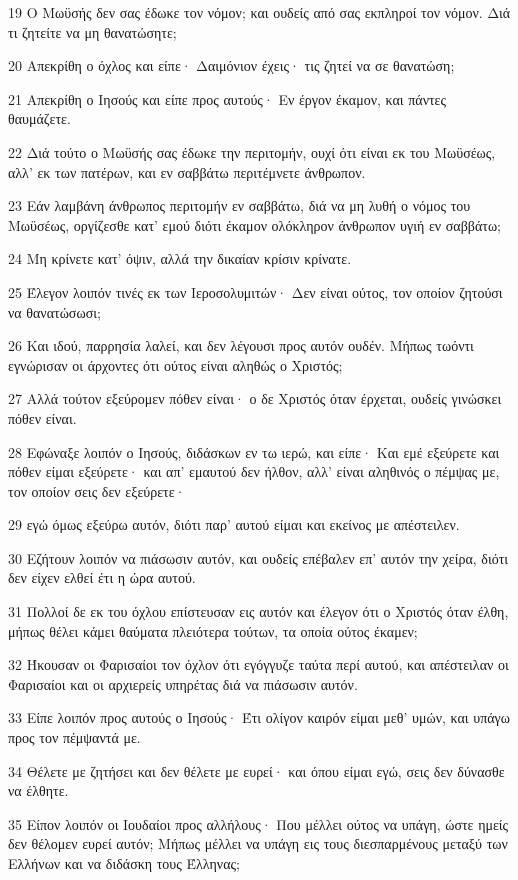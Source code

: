\par 19 Ο Μωϋσής δεν σας έδωκε τον νόμον; και ουδείς από σας εκπληροί τον νόμον. Διά τι ζητείτε να μη θανατώσητε;
\par 20 Απεκρίθη ο όχλος και είπε· Δαιμόνιον έχεις· τις ζητεί να σε θανατώση;
\par 21 Απεκρίθη ο Ιησούς και είπε προς αυτούς· Εν έργον έκαμον, και πάντες θαυμάζετε.
\par 22 Διά τούτο ο Μωϋσής σας έδωκε την περιτομήν, ουχί ότι είναι εκ του Μωϋσέως, αλλ' εκ των πατέρων, και εν σαββάτω περιτέμνετε άνθρωπον.
\par 23 Εάν λαμβάνη άνθρωπος περιτομήν εν σαββάτω, διά να μη λυθή ο νόμος του Μωϋσέως, οργίζεσθε κατ' εμού διότι έκαμον ολόκληρον άνθρωπον υγιή εν σαββάτω;
\par 24 Μη κρίνετε κατ' όψιν, αλλά την δικαίαν κρίσιν κρίνατε.
\par 25 Έλεγον λοιπόν τινές εκ των Ιεροσολυμιτών· Δεν είναι ούτος, τον οποίον ζητούσι να θανατώσωσι;
\par 26 Και ιδού, παρρησία λαλεί, και δεν λέγουσι προς αυτόν ουδέν. Μήπως τωόντι εγνώρισαν οι άρχοντες ότι ούτος είναι αληθώς ο Χριστός;
\par 27 Αλλά τούτον εξεύρομεν πόθεν είναι· ο δε Χριστός όταν έρχεται, ουδείς γινώσκει πόθεν είναι.
\par 28 Εφώναξε λοιπόν ο Ιησούς, διδάσκων εν τω ιερώ, και είπε· Και εμέ εξεύρετε και πόθεν είμαι εξεύρετε· και απ' εμαυτού δεν ήλθον, αλλ' είναι αληθινός ο πέμψας με, τον οποίον σεις δεν εξεύρετε·
\par 29 εγώ όμως εξεύρω αυτόν, διότι παρ' αυτού είμαι και εκείνος με απέστειλεν.
\par 30 Εζήτουν λοιπόν να πιάσωσιν αυτόν, και ουδείς επέβαλεν επ' αυτόν την χείρα, διότι δεν είχεν ελθεί έτι η ώρα αυτού.
\par 31 Πολλοί δε εκ του όχλου επίστευσαν εις αυτόν και έλεγον ότι ο Χριστός όταν έλθη, μήπως θέλει κάμει θαύματα πλειότερα τούτων, τα οποία ούτος έκαμεν;
\par 32 Ήκουσαν οι Φαρισαίοι τον όχλον ότι εγόγγυζε ταύτα περί αυτού, και απέστειλαν οι Φαρισαίοι και οι αρχιερείς υπηρέτας διά να πιάσωσιν αυτόν.
\par 33 Είπε λοιπόν προς αυτούς ο Ιησούς· Έτι ολίγον καιρόν είμαι μεθ' υμών, και υπάγω προς τον πέμψαντά με.
\par 34 Θέλετε με ζητήσει και δεν θέλετε με ευρεί· και όπου είμαι εγώ, σεις δεν δύνασθε να έλθητε.
\par 35 Είπον λοιπόν οι Ιουδαίοι προς αλλήλους· Που μέλλει ούτος να υπάγη, ώστε ημείς δεν θέλομεν ευρεί αυτόν; Μήπως μέλλει να υπάγη εις τους διεσπαρμένους μεταξύ των Ελλήνων και να διδάσκη τους Έλληνας;
